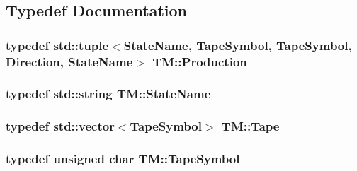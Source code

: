 \subsection{\-Typedef \-Documentation}
\hypertarget{namespaceTM_a87460339f40338ea4e37433443965554}{
\subsubsection[{\-Production}]{\setlength{\rightskip}{0pt plus 5cm}typedef std\-::tuple$<${\bf \-State\-Name}, {\bf \-Tape\-Symbol}, {\bf \-Tape\-Symbol}, {\bf \-Direction}, {\bf \-State\-Name}$>$ {\bf \-T\-M\-::\-Production}}}\label{d6/d65/namespaceTM_a87460339f40338ea4e37433443965554}
\hypertarget{namespaceTM_a852554502c474841ede5736b807839ff}{
\subsubsection[{\-State\-Name}]{\setlength{\rightskip}{0pt plus 5cm}typedef std\-::string {\bf \-T\-M\-::\-State\-Name}}}\label{d6/d65/namespaceTM_a852554502c474841ede5736b807839ff}
\hypertarget{namespaceTM_a20b31cfe7d86b00db299e72ad48f70af}{
\subsubsection[{\-Tape}]{\setlength{\rightskip}{0pt plus 5cm}typedef std\-::vector$<${\bf \-Tape\-Symbol}$>$ {\bf \-T\-M\-::\-Tape}}}\label{d6/d65/namespaceTM_a20b31cfe7d86b00db299e72ad48f70af}
\hypertarget{namespaceTM_af53c0529f78dfcdeb19c450abbd44cf6}{
\subsubsection[{\-Tape\-Symbol}]{\setlength{\rightskip}{0pt plus 5cm}typedef unsigned char {\bf \-T\-M\-::\-Tape\-Symbol}}}\label{d6/d65/namespaceTM_af53c0529f78dfcdeb19c450abbd44cf6}


